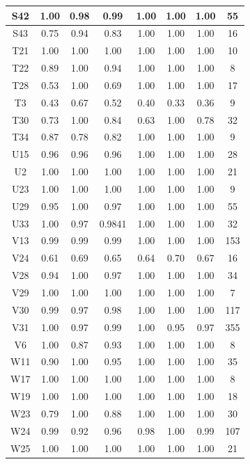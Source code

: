 \documentclass[10pt,onecolumn,letterpaper]{article}
\begin{document}
\begin{longtable}{|c|c|c|c|c|c|c|c|}
		S42 & 1.00 & 0.98 & 0.99   &1.00&1.00&1.00&   55 \\ \hline
		S43 & 0.75 & 0.94 & 0.83    &1.00&1.00&1.00& 16 \\ \hline
		T21 & 1.00 & 1.00 & 1.00    &1.00&1.00&1.00& 10 \\ \hline
		T22 & 0.89 & 1.00 & 0.94    &1.00&1.00&1.00&   8 \\ \hline
		T28 & 0.53 & 1.00 & 0.69    &1.00&1.00&1.00& 17 \\ \hline
		T3 & 0.43 & 0.67 & 0.52   &0.40&0.33&0.36&    9 \\ \hline
		T30 & 0.73 & 1.00 & 0.84   &0.63&1.00&0.78&   32 \\ \hline
		T34 & 0.87 & 0.78 & 0.82   &1.00&1.00&1.00&    9 \\ \hline
		U15 & 0.96 & 0.96 & 0.96    &1.00&1.00&1.00&  28 \\ \hline
		U2 & 1.00 & 1.00 & 1.00   &1.00&1.00&1.00&  21 \\ \hline
		U23 & 1.00 & 1.00 & 1.00   &1.00&1.00&1.00&    9 \\ \hline
		U29 & 0.95 & 1.00 & 0.97   &1.00&1.00&1.00&  55 \\ \hline
		U33 & 1.00 & 0.97 & 0.9841  &1.00&1.00&1.00&    32 \\ \hline
		V13 & 0.99 & 0.99 & 0.99   &1.00&1.00&1.00& 153 \\ \hline
		V24 & 0.61 & 0.69 & 0.65    &0.64&0.70&0.67& 16 \\ \hline
		V28 & 0.94 & 1.00 & 0.97   &1.00&1.00&1.00&   34 \\ \hline
		V29 & 1.00 & 1.00 & 1.00   &1.00&1.00&1.00&   7 \\ \hline
		V30 & 0.99 & 0.97 & 0.98   &1.00&1.00&1.00& 117 \\ \hline
		V31 & 1.00 & 0.97 & 0.99 &1.00&0.95&0.97& 355 \\ \hline
		V6 & 1.00 & 0.87 & 0.93   &1.00&1.00&1.00&   8 \\ \hline
		W11 & 0.90 & 1.00 & 0.95    &1.00&1.00&1.00&  35 \\ \hline
		W17 & 1.00 & 1.00 & 1.00    &1.00&1.00&1.00&   8 \\ \hline
		W19 & 1.00 & 1.00 & 1.00    &1.00&1.00&1.00& 18 \\ \hline
		W23 & 0.79 & 1.00 & 0.88     &1.00&1.00&1.00& 30 \\ \hline
		W24 & 0.99 & 0.92 & 0.96   &0.98&1.00&0.99& 107 \\ \hline
		W25 & 1.00 & 1.00 & 1.00   &1.00&1.00&1.00&  21 \\ \hline

\end{longtable}
\end{document}
